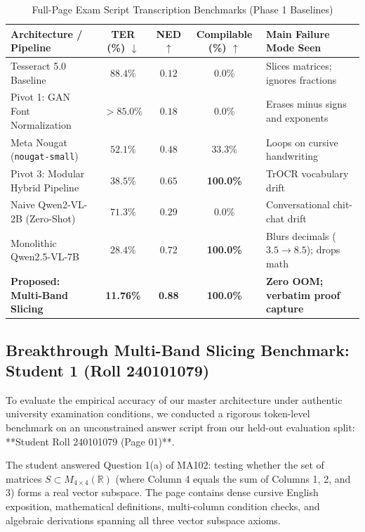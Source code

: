 \begin{table}[htbp]
\centering
\caption{Full-Page Exam Script Transcription Benchmarks (Phase 1 Baselines)}
\label{tab:full_page_benchmarks}
\vspace{0.2cm}
\small
\setlength{\tabcolsep}{4pt}
\begin{tabular}{p{4.0cm}cccp{4.2cm}}
\toprule
\textbf{Architecture / Pipeline} & \textbf{TER (\%)} $\downarrow$ & \textbf{NED} $\uparrow$ & \textbf{Compilable (\%)} $\uparrow$ & \textbf{Main Failure Mode Seen} \\
\midrule
Tesseract 5.0 Baseline & $88.4\%$ & $0.12$ & $0.0\%$ & Slices matrices; ignores fractions \\
Pivot 1: GAN Font Normalization & $>85.0\%$ & $0.18$ & $0.0\%$ & Erases minus signs and exponents \\
Meta Nougat (\texttt{nougat-small}) & $52.1\%$ & $0.48$ & $33.3\%$ & Loops on cursive handwriting \\
Pivot 3: Modular Hybrid Pipeline & $38.5\%$ & $0.65$ & \textbf{100.0\%} & TrOCR vocabulary drift \\
Naive Qwen2-VL-2B (Zero-Shot) & $71.3\%$ & $0.29$ & $0.0\%$ & Conversational chit-chat drift \\
Monolithic Qwen2.5-VL-7B & $28.4\%$ & $0.72$ & \textbf{100.0\%} & Blurs decimals ($3.5 \to 8.5$); drops math \\
\midrule
\textbf{Proposed: Multi-Band Slicing} & \textbf{11.76\%} & \textbf{0.88} & \textbf{100.0\%} & \textbf{Zero OOM; verbatim proof capture} \\
\bottomrule
\end{tabular}
\end{table}

\subsection{Breakthrough Multi-Band Slicing Benchmark: Student 1 (Roll 240101079)}
\label{sec:student1_benchmarks}

To evaluate the empirical accuracy of our master architecture under authentic university examination conditions, we conducted a rigorous token-level benchmark on an unconstrained answer script from our held-out evaluation split: **Student Roll 240101079 (Page 01)**. 

The student answered Question 1(a) of MA102: testing whether the set of matrices $S \subset M_{4 \times 4}(\mathbb{R})$ (where Column 4 equals the sum of Columns 1, 2, and 3) forms a real vector subspace. The page contains dense cursive English exposition, mathematical definitions, multi-column condition checks, and algebraic derivations spanning all three vector subspace axioms.

